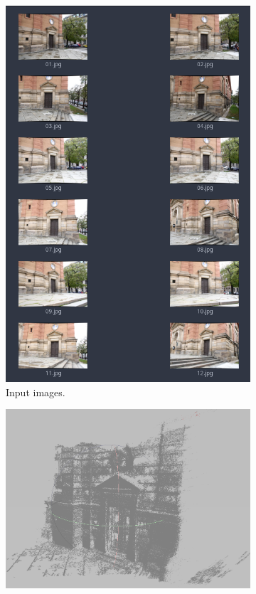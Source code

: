 \begin{figure}[h]
    \begin{subfigure}[h]{0.31\textwidth}
      \includegraphics[width=\textwidth]{graphics/input_set.png}
      \caption{Input images.}
      \label{fig:pc_input}
    \end{subfigure}
    \hfill
    \begin{subfigure}[h]{0.65\textwidth}
      \includegraphics[width=\textwidth]{graphics/reconstructed.png}

\end{subfigure}
\end{figure}
